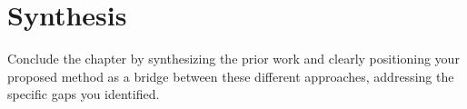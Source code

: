 \section{Synthesis}

\begin{outline}
  Conclude the chapter by synthesizing the prior work and clearly
  positioning your proposed method as a bridge between these
  different approaches, addressing the specific gaps you identified.
\end{outline}
